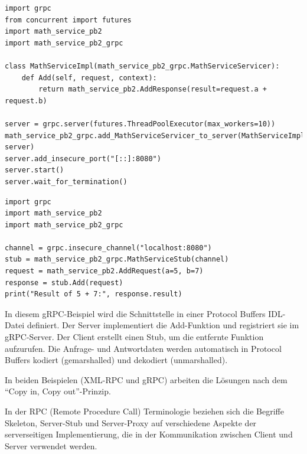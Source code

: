 \noindent\begin{minipage}{\textwidth}
\begin{lstlisting}[caption={gRPC Server Python},captionpos=b,label={lst:grpc-server}]
import grpc
from concurrent import futures
import math_service_pb2
import math_service_pb2_grpc

class MathServiceImpl(math_service_pb2_grpc.MathServiceServicer):
    def Add(self, request, context):
        return math_service_pb2.AddResponse(result=request.a + request.b)

server = grpc.server(futures.ThreadPoolExecutor(max_workers=10))
math_service_pb2_grpc.add_MathServiceServicer_to_server(MathServiceImpl(), server)
server.add_insecure_port("[::]:8080")
server.start()
server.wait_for_termination()
\end{lstlisting}
\end{minipage}

\noindent\begin{minipage}{\textwidth}
\begin{lstlisting}[caption={gRPC Client Python},captionpos=b,label={lst:grpc-client}]
import grpc
import math_service_pb2
import math_service_pb2_grpc

channel = grpc.insecure_channel("localhost:8080")
stub = math_service_pb2_grpc.MathServiceStub(channel)
request = math_service_pb2.AddRequest(a=5, b=7)
response = stub.Add(request)
print("Result of 5 + 7:", response.result)
\end{lstlisting}
\end{minipage}

In diesem gRPC-Beispiel wird die Schnittstelle in einer Protocol Buffers IDL-Datei definiert. Der Server implementiert die Add-Funktion und registriert sie im gRPC-Server. Der Client erstellt einen Stub, um die entfernte Funktion aufzurufen. Die Anfrage- und Antwortdaten werden automatisch in Protocol Buffers kodiert (gemarshalled) und dekodiert (unmarshalled).

In beiden Beispielen (XML-RPC und gRPC) arbeiten die Lösungen nach dem \enquote{Copy in, Copy out}-Prinzip.

In der RPC (Remote Procedure Call) Terminologie beziehen sich die Begriffe Skeleton, Server-Stub und Server-Proxy auf verschiedene Aspekte der serverseitigen Implementierung, die in der Kommunikation zwischen Client und Server verwendet werden. 

